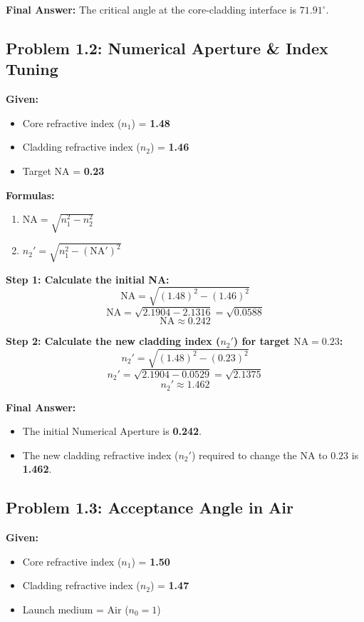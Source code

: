 \textbf{Final Answer:}
The critical angle at the core-cladding interface is \textbf{$71.91^\circ$}.


\subsection{Problem 1.2: Numerical Aperture \& Index Tuning}
\textbf{Given:}
\begin{itemize}
  \item   Core refractive index ($n_1$) = \textbf{1.48}
  \item   Cladding refractive index ($n_2$) = \textbf{1.46}
  \item   Target NA = \textbf{0.23}
\end{itemize}

\textbf{Formulas:}
\begin{enumerate}
  \item $\text{NA} = \sqrt{n_1^2 - n_2^2}$
  \item $n_2' = \sqrt{n_1^2 - (\text{NA}')^2}$
\end{enumerate}

\textbf{Step 1: Calculate the initial NA:}
\[ \text{NA} = \sqrt{(1.48)^2 - (1.46)^2} \]
\[ \text{NA} = \sqrt{2.1904 - 2.1316} = \sqrt{0.0588} \]
\[ \text{NA} \approx 0.242 \]

\textbf{Step 2: Calculate the new cladding index ($n_2'$) for target $\text{NA} = 0.23$:}
\[ n_2' = \sqrt{(1.48)^2 - (0.23)^2} \]
\[ n_2' = \sqrt{2.1904 - 0.0529} = \sqrt{2.1375} \]
\[ n_2' \approx 1.462 \]

\textbf{Final Answer:}
\begin{itemize}
  \item   The initial Numerical Aperture is \textbf{0.242}.
  \item   The new cladding refractive index ($n_2'$) required to change the NA to $0.23$ is \textbf{1.462}.
\end{itemize}


\subsection{Problem 1.3: Acceptance Angle in Air}
\textbf{Given:}
\begin{itemize}
  \item   Core refractive index ($n_1$) = \textbf{1.50}
  \item   Cladding refractive index ($n_2$) = \textbf{1.47}
  \item   Launch medium = Air ($n_0 = 1$)
\end{itemize}

